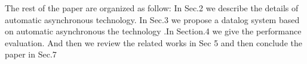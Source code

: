 \begin{itemize}
\end{itemize}

The rest of the paper are organized as follow: In Sec.2 we describe the details of  automatic asynchronous technology. In Sec.3 we propose a datalog system based on automatic asynchronous the technology .In Section.4  we give the performance evaluation. And then we review the related works in Sec 5 and then conclude the paper in Sec.7



